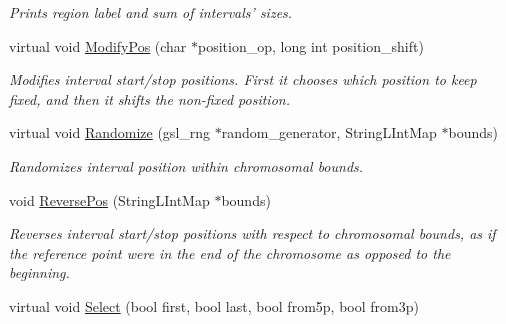 \begin{DoxyCompactItemize}
\begin{DoxyCompactList}\small\item\em Prints region label and sum of intervals' sizes. \end{DoxyCompactList}\item 
virtual void \hyperlink{classGenomicRegion_a0721b07af0850057e4ab9cd416ecac2f}{ModifyPos} (char $\ast$position\_\-op, long int position\_\-shift)
\begin{DoxyCompactList}\small\item\em Modifies interval start/stop positions. First it chooses which position to keep fixed, and then it shifts the non-\/fixed position. \end{DoxyCompactList}\item 
\hypertarget{classGenomicRegion_a222b3b8f567c306ee5a71ea3a720ef43}{
virtual void \hyperlink{classGenomicRegion_a222b3b8f567c306ee5a71ea3a720ef43}{Randomize} (gsl\_\-rng $\ast$random\_\-generator, StringLIntMap $\ast$bounds)}
\label{classGenomicRegion_a222b3b8f567c306ee5a71ea3a720ef43}

\begin{DoxyCompactList}\small\item\em Randomizes interval position within chromosomal bounds. \end{DoxyCompactList}\item 
\hypertarget{classGenomicRegion_a6120af435fb9ee68cb5a3d5066a4fda4}{
void \hyperlink{classGenomicRegion_a6120af435fb9ee68cb5a3d5066a4fda4}{ReversePos} (StringLIntMap $\ast$bounds)}
\label{classGenomicRegion_a6120af435fb9ee68cb5a3d5066a4fda4}

\begin{DoxyCompactList}\small\item\em Reverses interval start/stop positions with respect to chromosomal bounds, as if the reference point were in the end of the chromosome as opposed to the beginning. \end{DoxyCompactList}\item 
\hypertarget{classGenomicRegion_a461fbb00db1b45061e641f37614fb146}{
virtual void \hyperlink{classGenomicRegion_a461fbb00db1b45061e641f37614fb146}{Select} (bool first, bool last, bool from5p, bool from3p)}
\label{classGenomicRegion_a461fbb00db1b45061e641f37614fb146}


\end{DoxyCompactItemize}

